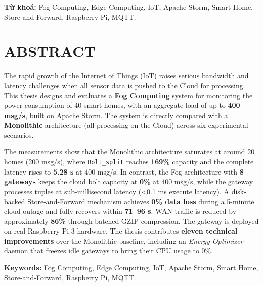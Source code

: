 \documentclass[13pt,a4paper]{report}
\newcommand{\code}[1]{\texttt{\small #1}}
\begin{document}
\vspace{0.8em}
\noindent\textbf{Từ khoá:} Fog Computing, Edge Computing, IoT, Apache Storm,
Smart Home, Store-and-Forward, Raspberry Pi, MQTT.

\chapter*{ABSTRACT}
\thispagestyle{plain}
The rapid growth of the Internet of Things (IoT) raises serious bandwidth and
latency challenges when all sensor data is pushed to the Cloud for processing.
This thesis designs and evaluates a \textbf{Fog Computing} system for monitoring
the power consumption of 40 smart homes, with an aggregate load of up to
\textbf{400 msg/s}, built on Apache Storm. The system is directly compared with a
\textbf{Monolithic} architecture (all processing on the Cloud) across six
experimental scenarios.

The measurements show that the Monolithic architecture saturates at around 20
homes (200 msg/s), where \code{Bolt\_split} reaches \textbf{169\%} capacity and
the complete latency rises to \textbf{5.28 s} at 400 msg/s. In contrast, the Fog
architecture with \textbf{8 gateways} keeps the cloud bolt capacity at
\textbf{0\%} at 400 msg/s, while the gateway processes tuples at sub-millisecond
latency (\textless 0.1 ms execute latency). A disk-backed Store-and-Forward
mechanism achieves \textbf{0\% data loss} during a 5-minute cloud outage and
fully recovers within \textbf{71--96 s}. WAN traffic is reduced by approximately
\textbf{86\%} through batched GZIP compression. The gateway is deployed on real
Raspberry Pi 3 hardware. The thesis contributes \textbf{eleven technical
improvements} over the Monolithic baseline, including an \textit{Energy
Optimizer} daemon that freezes idle gateways to bring their CPU usage to 0\%.

\vspace{0.8em}
\noindent\textbf{Keywords:} Fog Computing, Edge Computing, IoT, Apache Storm,
Smart Home, Store-and-Forward, Raspberry Pi, MQTT.

\tableofcontents
\listoffigures
\listoftables

\end{document}
